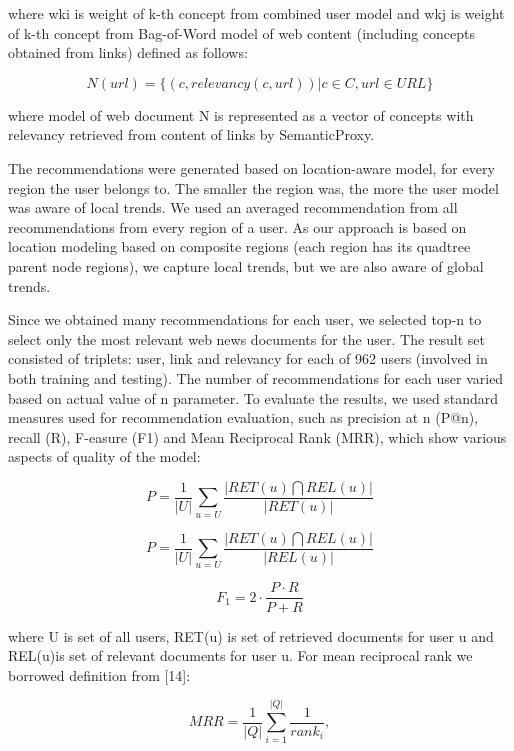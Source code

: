 \documentclass[a4, conference]{IEEEtran}
\begin{document}
where wki  is  weight  of k-th  concept  from  combined  user model  and wkj  is  weight  of k-th  concept  from  Bag-of-Word model  of  web  content  (including  concepts  obtained  from links) defined as follows: 

\begin{equation}
N(url)=\{(c,relevancy(c,url))|c\in C, url \in URL\}
\end{equation}

where  model  of  web  document N  is  represented  as  a  vector of concepts with relevancy retrieved from content of links by SemanticProxy.  

The recommendations were generated based on location-aware  model,  for  every  region  the  user  belongs  to. The smaller  the  region  was,  the  more  the  user  model  was  aware of  local  trends.  We  used  an  averaged  recommendation  from all  recommendations  from  every  region  of  a  user.  As  our approach is based on  location  modeling based on  composite regions  (each  region  has  its  quadtree  parent  node  regions), we  capture  local  trends,  but  we  are  also  aware  of  global trends.  

Since we obtained many recommendations for each user, we selected top-n to select only the  most relevant web news documents for  the  user.  The  result  set  consisted  of  triplets: user,  link  and  relevancy  for  each  of  962  users  (involved  in both  training  and  testing).  The  number  of  recommendations for each user varied based on actual value of n parameter.  To  evaluate  the  results,  we  used  standard  measures used for   recommendation   evaluation,   such   as   precision   at   n (P@n),  recall  (R),  F-easure  (F1)  and  Mean  Reciprocal Rank  (MRR),  which  show  various  aspects  of  quality  of  the model: 


$$P=\frac{1}{|U|}\displaystyle\sum_{u=U}\frac{|RET(u)\bigcap REL(u)|}{|RET(u)|}$$

\begin{equation}
P=\frac{1}{|U|}\displaystyle\sum_{u=U}\frac{|RET(u)\bigcap REL(u)|}{|REL(u)|}
\end{equation}

$$F_{1}=2\cdotp \frac{P\cdotp R}{P+R}$$


where U  is  set  of  all  users, RET(u)  is  set  of  retrieved documents   for   user u   and REL(u)is   set   of   relevant documents for user u. For mean reciprocal rank we borrowed definition from [14]: 

\begin{equation}
MRR=\frac{1}{|Q|}\displaystyle\sum_{i=1}^{|Q|}\frac{1}{rank_{i}},
\end{equation}
\end{document}
